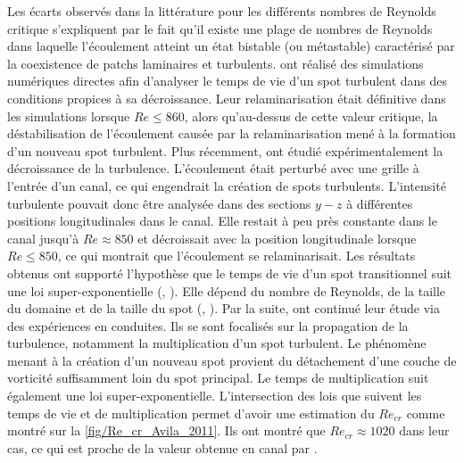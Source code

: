 Les écarts observés dans la littérature pour les différents nombres de Reynolds critique s’expliquent par le fait qu’il existe une plage de nombres de Reynolds dans laquelle l’écoulement atteint un état bistable (ou métastable) caractérisé par la coexistence de patchs laminaires et turbulents. \cite{Avila2010} ont réalisé des simulations numériques directes afin d’analyser le temps de vie d’un spot turbulent dans des conditions propices à sa décroissance. Leur relaminarisation était définitive dans les simulations lorsque $Re \leq 860$, alors qu’au-dessus de cette valeur critique, la déstabilisation de l'écoulement causée par la relaminarisation mené à la formation d'un nouveau spot turbulent. Plus récemment, \citet{Sano2016} ont étudié expérimentalement la décroissance de la turbulence. L'écoulement était perturbé avec une grille à l'entrée d'un canal, ce qui engendrait la création de spots turbulents. L'intensité turbulente pouvait donc être analysée dans des sections $y-z$ à différentes positions longitudinales dans le canal. Elle restait à peu près constante dans le canal jusqu'à $Re \approx 850$ et décroissait avec la position longitudinale lorsque $Re \leq 850$, ce qui montrait que l'écoulement se relaminarisait. Les résultats obtenus ont supporté l'hypothèse que le temps de vie d'un spot transitionnel suit une loi super-exponentielle (\cite{Hof2008}, \cite{Avila2010}). Elle dépend du nombre de Reynolds, de la taille du domaine et de la taille du spot (\cite{Goldenfeld2010}, \cite{Avila2023}). Par la suite, \cite{Avila2011} ont continué leur étude via des expériences en conduites. Ils se sont focalisés sur la propagation de la turbulence, notamment la multiplication d'un spot turbulent. Le phénomène menant à la création d’un nouveau spot provient du détachement d’une couche de vorticité suffisamment loin du spot principal. Le temps de multiplication suit également une loi super-exponentielle. L’intersection des lois que suivent les temps de vie et de multiplication permet d’avoir une estimation du $Re_{cr}$ comme montré sur la \cref{fig/Re_cr_Avila_2011}. Ils ont montré que $Re_{cr} \approx 1020$ dans leur cas, ce qui est proche de la valeur obtenue en canal par \cite{Orszag1980}.\\

